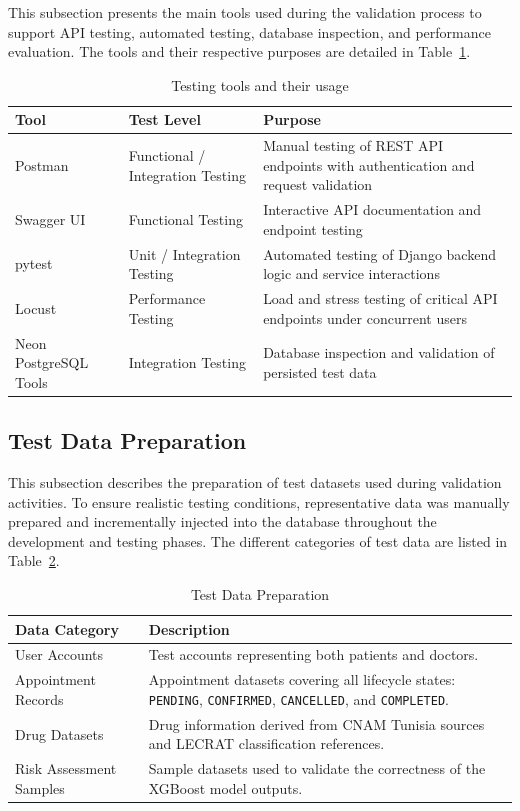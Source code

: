 This subsection presents the main tools used during the validation process to support API testing, automated testing, database inspection, and performance evaluation. The tools and their respective purposes are detailed in Table~\ref{tab:testing_tools}.

\begin{table}[H]
\centering
\caption{Testing tools and their usage}
\label{tab:testing_tools}
\renewcommand{\arraystretch}{1.3}

\begin{tabular}{|p{3.2cm}|p{3cm}|p{7cm}|}
\hline
\textbf{Tool} & \textbf{Test Level} & \textbf{Purpose} \\
\hline
Postman & Functional / Integration Testing & Manual testing of REST API endpoints with authentication and request validation \\
\hline
Swagger UI & Functional Testing & Interactive API documentation and endpoint testing \\
\hline
pytest & Unit / Integration Testing & Automated testing of Django backend logic and service interactions \\
\hline
Locust & Performance Testing & Load and stress testing of critical API endpoints under concurrent users \\
\hline
Neon PostgreSQL Tools & Integration Testing & Database inspection and validation of persisted test data \\
\hline
\end{tabular}
\end{table}

\subsection{Test Data Preparation}
This subsection describes the preparation of test datasets used during validation activities. To ensure realistic testing conditions, representative data was manually prepared and incrementally injected into the database throughout the development and testing phases. The different categories of test data are listed in Table~\ref{tab:test_data_preparation}.
\begin{table}[H]
\centering
\caption{Test Data Preparation}
\label{tab:test_data_preparation}
\renewcommand{\arraystretch}{1.3}
\begin{tabular}{|p{4.5cm}|p{10cm}|}
\hline
\textbf{Data Category} & \textbf{Description} \\
\hline
User Accounts & Test accounts representing both patients and doctors. \\
\hline
Appointment Records & Appointment datasets covering all lifecycle states: \texttt{PENDING}, \texttt{CONFIRMED}, \texttt{CANCELLED}, and \texttt{COMPLETED}. \\
\hline
Drug Datasets & Drug information derived from CNAM Tunisia sources and LECRAT classification references. \\
\hline
Risk Assessment Samples & Sample datasets used to validate the correctness of the XGBoost model outputs. \\
\hline
\end{tabular}
\end{table}


